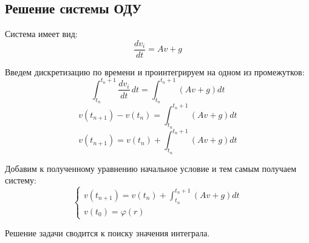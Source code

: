 \subsection{Решение системы ОДУ}

Система имеет вид:
\[
  \frac{d v_i}{dt} = Av + g
\]

Введем дискретизацию по времени и проинтегрируем на одном из промежутков:
\[
  \int_{t_{n}}^{t_n+1} \frac{d v_i}{dt} \,dt = \int_{t_{n}}^{t_n+1} (Av + g) dt
\]
\[
  v(t_{n+1}) - v(t_n) = \int_{t_{n}}^{t_n+1} (Av + g) dt
\]
\[
  v(t_{n+1}) = v(t_n) + \int_{t_{n}}^{t_n+1} (Av + g) dt
\]

Добавим к полученному уравнению начальное условие и тем самым получаем систему:
\[
  \begin{cases}
    v(t_{n+1}) = v(t_n) + \int_{t_{n}}^{t_n+1} (Av + g) dt \\
    v(t_0) = \varphi(r)
  \end{cases}
\]

Решение задачи сводится к поиску значения интеграла.